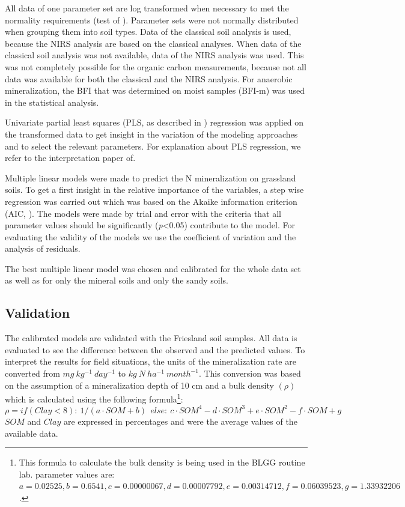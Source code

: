 \documentclass[10pt,twoside,dutch,english]{report}
\begin{document}
All data of one parameter set are log transformed when necessary to met the normality requirements (test of \citet{Shapiro1965}). Parameter sets were not normally distributed when grouping them into soil types. Data of the classical soil analysis is used, because the NIRS analysis are based on the classical analyses. When data of the classical soil analysis was not available, data of the NIRS analysis was used. This was not completely possible for the organic carbon measurements, because not all data was available for both the classical and the NIRS analysis. For anaerobic mineralization, the BFI that was determined on moist samples (BFI-m) was used in the statistical analysis. 


Univariate partial least squares (PLS, as described in \citet{Mevik2013}) regression was applied on the transformed data to get insight in the variation of the modeling approaches and to select the relevant parameters. For explanation about PLS regression, we refer to the interpretation paper of\citet{Garthwaite1994}. 


Multiple linear models were made to predict the N mineralization on grassland soils. To get a first insight in the relative importance of the variables, a step wise regression was carried out which was based on the Akaike information criterion (AIC, \citep{Sakamoto1986}). The models were made by trial and error with the criteria that all parameter values should be significantly (\textit{p}<0.05) contribute to the model. For evaluating the validity of the models we use the coefficient of variation and the analysis of residuals. 

The best multiple linear model was chosen and calibrated for the whole data set as well as for only the mineral soils and only the sandy soils. 

\subsection{Validation}
The calibrated models are validated with the Friesland soil samples. All data is evaluated to see the difference between the observed and the predicted values.  To interpret the results for field situations,  the units of the mineralization rate are converted from $mg\: kg^{-1}\: day^{-1}$ to $kg\:N\:ha^{-1}\: month^{-1}$. This conversion was based on the assumption of a mineralization depth of 10 cm and a  bulk density $(\rho)$ which is calculated using the following formula\footnote{This formula to calculate the bulk density is being used in the BLGG routine lab. parameter values are: $a=0.02525, b=0.6541, c=0.00000067, d=0.00007792, e=0.00314712, f=0.06039523, g=1.33932206$. }:
\[\rho = if (Clay<8):\: {1/(a\cdot SOM+b)} \:\:else:\: {c\cdot SOM^4-d\cdot SOM^3+e\cdot SOM^2-f\cdot SOM+g}\]
$SOM$ and $Clay$ are expressed in percentages and were the average values of the available data. 
\end{document}
